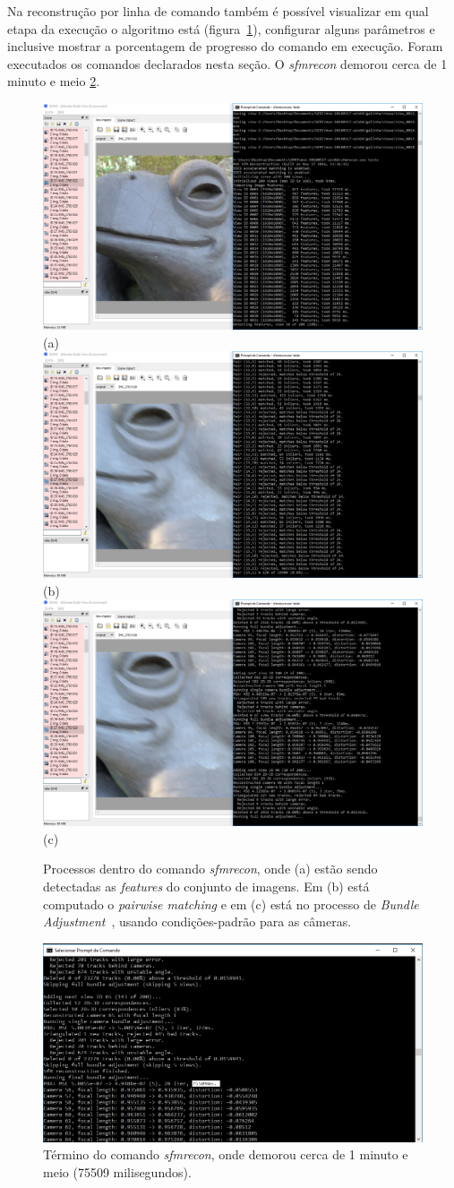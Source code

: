 Na reconstrução por linha de comando também é possível visualizar em qual etapa da execução o algoritmo está (figura~\ref{fig:passosMVE}), configurar alguns parâmetros e inclusive mostrar a porcentagem de progresso do comando em execução. Foram executados os comandos declarados nesta seção.  O \emph{sfmrecon} demorou cerca de 1 minuto e meio \ref{fig:MVESfM}. 

\newpage

\begin{figure}[!h]
	\centering
	\includegraphics[width=0.45\linewidth]{figs/umve2sfm.png} (a)
	\includegraphics[width=0.45\linewidth]{figs/umve3sfmfeature.png} (b)
	\includegraphics[width=0.45\linewidth]{figs/umve4ba.png} (c)
	\caption{%
	Processos dentro do comando \emph{sfmrecon}, onde (a) estão sendo detectadas as \emph{features} do conjunto de imagens. Em (b) está computado o \emph{pairwise matching} e em (c) está no processo de \emph{Bundle Adjustment}~\cite{bundleAdjustmentSlide}, usando condições-padrão para as câmeras.
	}\label{fig:passosMVE}
\end{figure} 

\begin{figure}[h!]
	\centering
	\includegraphics[width=0.65\linewidth]{figs/sfmmve.png}
	\caption{%
	Término do comando \emph{sfmrecon}, onde demorou cerca de 1 minuto e meio (75509 milisegundos).
	}\label{fig:MVESfM}
\end{figure}

